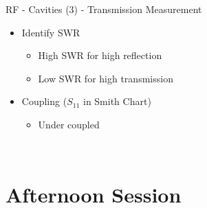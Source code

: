 \documentclass{beamer}
\begin{document}
\begin{frame}[t,fragile]{RF - Cavities (3) - Transmission Measurement}
\begin{itemize}
\item Identify SWR
\begin{itemize}
\item High SWR for high reflection
\item Low SWR for high transmission
\end{itemize}

\item Coupling ($S_{11}$ in Smith Chart)
\begin{itemize}
\item Under coupled
\end{itemize}
\end{itemize}
\begin{figure}
  \centering\setcounter{subfigure}{0}
  \quad
  \\
\end{figure}

\end{frame}

\section{Afternoon Session}
\end{document}
